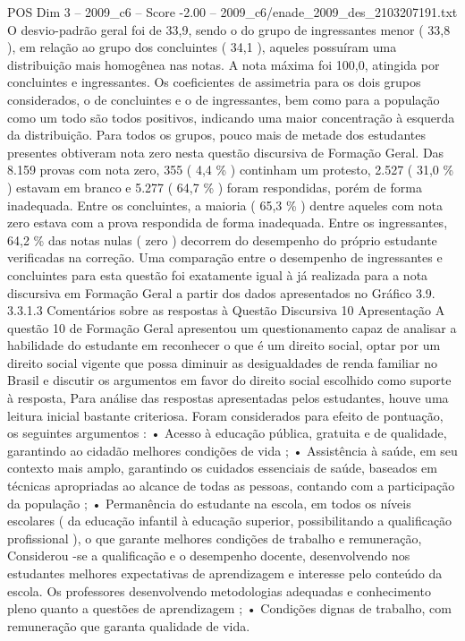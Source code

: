 \begin{textsample}{POS Dim 3 – 2009\_c6 – Score -2.00 – 2009\_c6/enade\_2009\_des\_2103207191.txt}
O desvio-padrão geral foi de 33,9, sendo o do grupo de ingressantes menor ( 33,8 ), em relação ao grupo dos concluintes ( 34,1 ), aqueles possuíram uma distribuição mais homogênea nas notas.
A nota máxima foi 100,0, atingida por concluintes e ingressantes.
Os coeficientes de assimetria para os dois grupos considerados, o de concluintes e o de ingressantes, bem como para a população como um todo são todos positivos, indicando uma maior concentração à esquerda da distribuição.
Para todos os grupos, pouco mais de metade dos estudantes presentes obtiveram nota zero nesta questão discursiva de Formação Geral.
Das 8.159 provas com nota zero, 355 ( 4,4 \% ) continham um protesto, 2.527 ( 31,0 \% ) estavam em branco e 5.277 ( 64,7 \% ) foram respondidas, porém de forma inadequada.
Entre os concluintes, a maioria ( 65,3 \% ) dentre aqueles com nota zero estava com a prova respondida de forma inadequada.
Entre os ingressantes, 64,2 \% das notas nulas ( zero ) decorrem do desempenho do próprio estudante verificadas na correção.
Uma comparação entre o desempenho de ingressantes e concluintes para esta questão foi exatamente igual à já realizada para a nota discursiva em Formação Geral a partir dos dados apresentados no Gráfico 3.9. 3.3.1.3 Comentários sobre as respostas à Questão Discursiva 10 Apresentação A questão 10 de Formação Geral apresentou um questionamento capaz de analisar a habilidade do estudante em reconhecer o que é um direito social, optar por um direito social vigente que possa diminuir as desigualdades de renda familiar no Brasil e discutir os argumentos em favor do direito social escolhido como suporte à resposta, Para análise das respostas apresentadas pelos estudantes, houve uma leitura inicial bastante criteriosa.
Foram considerados para efeito de pontuação, os seguintes argumentos : • Acesso à educação pública, gratuita e de qualidade, garantindo ao cidadão melhores condições de vida ; • Assistência à saúde, em seu contexto mais amplo, garantindo os cuidados essenciais de saúde, baseados em técnicas apropriadas ao alcance de todas as pessoas, contando com a participação da população ; • Permanência do estudante na escola, em todos os níveis escolares ( da educação infantil à educação superior, possibilitando a qualificação profissional ), o que garante melhores condições de trabalho e remuneração, Considerou -se a qualificação e o desempenho docente, desenvolvendo nos estudantes melhores expectativas de aprendizagem e interesse pelo conteúdo da escola.
Os professores desenvolvendo metodologias adequadas e conhecimento pleno quanto a questões de aprendizagem ; • Condições dignas de trabalho, com remuneração que garanta qualidade de vida.

\end{textsample}
